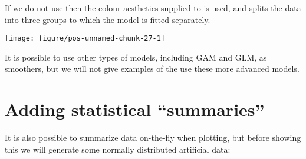 \documentclass[paper=a4,10pt,div=17,headsepline,BCOR=12mm,twoside,open=right]{scrbook}\usepackage{knitr}
\begin{document}
If we do not use  then the colour aesthetics supplied to  is used, and splits the data into three groups to which the model is fitted separately.

\begin{knitrout}\footnotesize
{}\color{fgcolor}\begin{kframe}
\begin{alltt}
 \hlopt{+} \hlstd{(}\hlstd{=}\hlstd{)}
\end{alltt}
\end{kframe}

{\centering \texttt{[image: figure/pos-unnamed-chunk-27-1]} 

}



\end{knitrout}

It is possible to use other types of models, including GAM and GLM, as smoothers, but we will not give examples of the use these more advanced models.

\section{Adding statistical ``summaries''}

It is also possible to summarize data on-the-fly when plotting, but before showing this we will generate some normally distributed artificial data:

\begin{knitrout}\footnotesize
{}\color{fgcolor}\begin{kframe}
\begin{alltt}
 \hlkwb{<-} \hlstd{(}
   \hlstd{=} \hlstd{(}\hlstd{(}\hlstd{,} \hlstd{=}\hlstd{,} \hlstd{=}\hlstd{),} \hlstd{(}\hlstd{,} \hlstd{=}\hlstd{,} \hlstd{=}\hlstd{)),}
   \hlstd{=} \hlstd{(}\hlstd{(}\hlstd{(}\hlstd{,} \hlstd{),} \hlstd{(}\hlstd{,} \hlstd{)))}
  \hlstd{)}
\end{alltt}
\end{kframe}
\end{knitrout}
\end{document}

